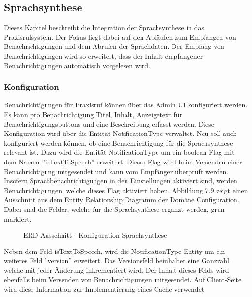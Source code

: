 \subsection{Sprachsynthese}

Dieses Kapitel beschreibt die Integration der Sprachsynthese in das Praxisrufsystem.
Der Fokus liegt dabei auf den Abläufen zum Empfangen von Benachrichtigungen und dem Abrufen der Sprachdaten.
Der Empfang von Benachrichtigungen wird so erweitert, dass der Inhalt empfangener Benachrichtigungen automatisch vorgelesen wird.

\subsubsection{Konfiguration}

Benachrichtigungen für Praxisruf können über das Admin UI konfiguriert werden.
Es kann pro Benachrichtigung Titel, Inhalt, Anzeigetext für Benachrichtigungsbuttons und eine Beschreibung erfasst werden.
Diese Konfiguration wird über die Entität NotificationType verwaltet.
Neu soll auch konfiguriert werden können, ob eine Benachrichtigung für die Sprachsynthese relevant ist.
Dazu wird die Entität NotificationType um ein boolean Flag mit dem Namen ''isTextToSpeech'' erweitert.
Dieses Flag wird beim Versenden einer Benachrichtigung mitgesendet und kann vom Empfänger überprüft werden.
Insofern Sprachbenachrichtigungen in den Einstellungen aktiviert sind, werden Benachrichtigungen, welche dieses Flag aktiviert haben.
Abbildung 7.9 zeigt einen Ausschnitt aus dem Entity Relationship Diagramm der Domäne Configuration.
Dabei sind die Felder, welche für die Sprachsynthese ergänzt werden, grün markiert.

\begin{figure}[h]
    \centering
    \begin{minipage}[b]{0.75\textwidth}
        \caption{ERD Ausschnitt - Konfiguration Sprachsynthese}
    \end{minipage}
\end{figure}

Neben dem Feld isTextToSpeech, wird die NotificationType Entity um ein weiteres Feld ''version'' erweitert.
Das Versionsfeld beinhaltet eine Ganzzahl welche mit jeder Änderung inkrementiert wird.
Der Inhalt dieses Felds wird ebenfalls beim Versenden von Benachrichtigungen mitgesendet.
Auf Client-Seite wird diese Information zur Implementierung eines Cache verwendet.

